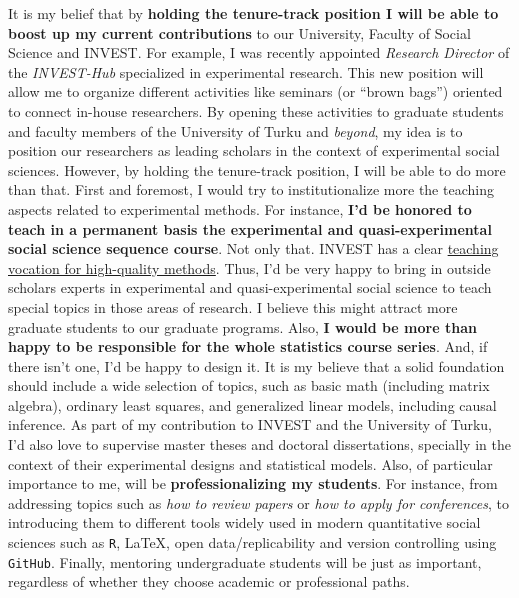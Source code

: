 \documentclass[10pt,stdletter,dateno,sigleft]{newlfm} %
\begin{document}
\begin{newlfm}
It is my belief that by {\bf holding the tenure-track position I will be able to boost up my current contributions} to our University, Faculty of Social Science and INVEST. For example, I was recently appointed \emph{Research Director} of the \emph{INVEST-Hub} specialized in experimental research. This new position will allow me to organize different activities like seminars (or ``brown bags'') oriented to connect in-house researchers. By opening these activities to graduate students and faculty members of the University of Turku and \emph{beyond}, my idea is to position our researchers as leading scholars in the context of experimental social sciences. However, by holding the tenure-track position, I will be able to do more than that. First and foremost, I would try to institutionalize more the teaching aspects related to experimental methods. For instance, {\bf I'd be honored to teach in a permanent basis the experimental and quasi-experimental social science sequence course}. Not only that. INVEST has a clear \href{https://invest.utu.fi/study-programmes/dpinvest/advanced-and-specialised-research-methods/}{teaching vocation for high-quality methods}. Thus, I'd be very happy to bring in outside scholars experts in experimental and quasi-experimental social science to teach special topics in those areas of research. I believe this might attract more graduate students to our graduate programs. Also, {\bf I would be more than happy to be responsible for the whole statistics course series}. And, if there isn't one, I'd be happy to design it. It is my believe that a solid foundation should include a wide selection of topics, such as basic math (including matrix algebra), ordinary least squares, and generalized linear models, including causal inference. As part of my contribution to INVEST and the University of Turku, I'd also love to supervise master theses and doctoral dissertations, specially in the context of their experimental designs and statistical models. Also, of particular importance to me, will be {\bf professionalizing my students}. For instance, from addressing topics such as \emph{how to review papers} or \emph{how to apply for conferences}, to introducing them to different tools widely used in modern quantitative social sciences such as \texttt{R}, \LaTeX\;, open data/replicability and version controlling using \texttt{GitHub}. Finally, mentoring undergraduate students will be just as important, regardless of whether they choose academic or professional paths. 


\end{newlfm}
\end{document}
